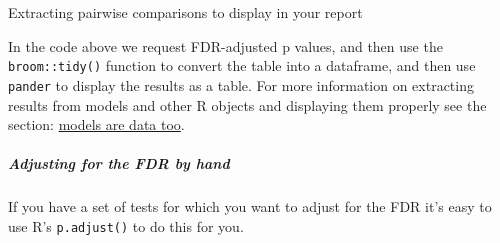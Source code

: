 \documentclass[]{article}
\newenvironment{Shaded}{\begin{snugshade}}{\end{snugshade}}
\newcommand{\DataTypeTok}[1]{\textcolor[rgb]{0.13,0.29,0.53}{#1}}
\newcommand{\DecValTok}[1]{\textcolor[rgb]{0.00,0.00,0.81}{#1}}
\newcommand{\FloatTok}[1]{\textcolor[rgb]{0.00,0.00,0.81}{#1}}
\newcommand{\KeywordTok}[1]{\textcolor[rgb]{0.13,0.29,0.53}{\textbf{#1}}}
\newcommand{\NormalTok}[1]{#1}
\newcommand{\OperatorTok}[1]{\textcolor[rgb]{0.81,0.36,0.00}{\textbf{#1}}}
\newcommand{\StringTok}[1]{\textcolor[rgb]{0.31,0.60,0.02}{#1}}
\let\oldsubparagraph\subparagraph
\renewcommand{\subparagraph}[1]{\oldsubparagraph{#1}\mbox{}}
\begin{document}
Extracting pairwise comparisons to display in your report

In the code above we request FDR-adjusted p values, and then use the
\texttt{broom::tidy()} function to convert the table into a dataframe, and then use
\texttt{pander} to display the results as a table. For more information on extracting
results from models and other R objects and displaying them properly see the
section: \protect\hyperlink{models-are-data-too}{models are data too}.

\hypertarget{adjusting-for-the-fdr-by-hand}{%
\subparagraph{Adjusting for the FDR by hand}\label{adjusting-for-the-fdr-by-hand}}

If you have a set of tests for which you want to adjust for the FDR it's easy to
use R's \texttt{p.adjust()} to do this for you.

\begin{Shaded}
\end{Shaded}
\end{document}
